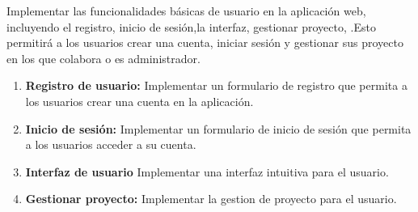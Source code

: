 \begin{doublespace}
    Implementar las funcionalidades básicas de usuario en la aplicación
    web, incluyendo el registro, inicio de sesión,la interfaz, gestionar proyecto,
    .Esto permitirá a los usuarios crear una cuenta, iniciar sesión y gestionar sus proyecto en los que colabora o es administrador.
    \begin{enumerate}
        \item \textbf{Registro de usuario:} Implementar un formulario de registro que permita a los
                usuarios crear una cuenta en la aplicación.
        \item \textbf{Inicio de sesión:} Implementar un formulario de inicio de sesión que permita a
                los usuarios acceder a su cuenta.
        \item \textbf{Interfaz de usuario } Implementar una interfaz intuitiva para el usuario.
        \item \textbf{Gestionar proyecto:} Implementar la gestion de proyecto para el usuario.
        
    \end{enumerate}

\end{doublespace}
